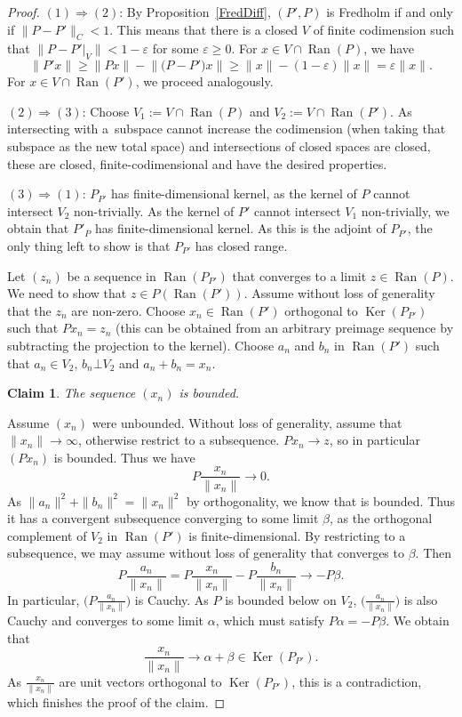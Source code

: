 \documentclass[pdftex]{sigma}
\numberwithin{equation}{section}
\newtheorem*{Claim}{Claim}
\DeclareMathOperator{\Ran}{Ran}
\DeclareMathOperator{\Ker}{Ker}
\begin{document}
	\begin{proof}
		$(1) \Rightarrow (2)$: By Proposition~\ref{FredDiff}, $(P',{P})$ is Fredholm if and only if $\|P-{P'}\|_C<1$. This means that there is a closed $V$ of finite codimension such that $\|P-{P'}|_V\|<1-\varepsilon$ for some $\varepsilon\geq 0$. For $x\in V\cap\Ran(P)$, we have
		\[\bigl\|{P'}x\bigr\|\geq\|Px\|-\bigl\|\bigl(P-{P'}\bigr)x\bigr\|\geq\|x\|-(1-\varepsilon)\|x\|=\varepsilon\|x\|.\]
		For $x\in V\cap \Ran({P'})$, we proceed analogously.
		
		$(2) \Rightarrow (3)$: Choose $V_1:=V\cap \Ran(P)$ and $V_2:=V\cap \Ran({P'})$. As intersecting with a~subspace cannot increase the codimension (when taking that subspace as the new total space) and intersections of closed spaces are closed, these are closed, finite-codimensional and have the desired properties.
				
		$(3)\Rightarrow (1)$:	
		$P_{P'}$ has finite-dimensional kernel, as the kernel of $P$ cannot intersect $V_2$ non-trivially. As the kernel of ${P'}$ cannot intersect $V_1$ non-trivially, we obtain that ${P'}_P$ has finite-dimensional kernel. As this is the adjoint of $P_{P'}$, the only thing left to show is that $P_{P'}$ has closed range.
		
		Let $(z_n)$ be a sequence in $\Ran(P_{P'})$ that converges to a limit $z\in\Ran(P)$. We need to show that $z\in P(\Ran(P'))$. Assume without loss of generality that the $z_n$ are non-zero. Choose $x_n\in \Ran({P'})$ orthogonal to $\Ker(P_{P'})$ such that $Px_n=z_n$ (this can be obtained from an arbitrary preimage sequence by subtracting the projection to the kernel). Choose $a_n$ and $b_n$ in $\Ran({P'})$ such that $a_n\in V_2$, $b_n\bot V_2$ and $a_n+b_n=x_n$.
		
\begin{Claim}
The sequence $(x_n)$ is bounded.
\end{Claim}
		
		Assume $(x_n)$ were unbounded. Without loss of generality, assume that $\|x_n\|\rightarrow\infty$, otherwise restrict to a subsequence. $Px_n\rightarrow z$, so in particular $(Px_n)$ is bounded. Thus we have
		\[P\frac{x_n}{\|x_n\|}\rightarrow 0.\]
		As $\|a_n\|^2+\|b_n\|^2=\|x_n\|^2$ by orthogonality, we know that  is bounded. Thus it has a convergent subsequence converging to some limit $\beta$, as the orthogonal complement of $V_2$ in $\Ran({P'})$ is finite-dimensional. By restricting to a subsequence, we may assume without loss of generality that  converges to $\beta$. Then
\[
P\frac{a_n}{\|x_n\|}=P\frac{x_n}{\|x_n\|}-P\frac{b_n}{\|x_n\|}\rightarrow-P\beta.
\]
		In particular, $\bigl(P\frac{a_n}{\|x_n\|}\bigr)$ is Cauchy. As $P$ is bounded below on $V_2$, $\bigl(\frac{a_n}{\|x_n\|}\bigr)$ is also Cauchy and converges to some limit $\alpha$, which must satisfy $P\alpha=-P\beta$. We obtain that
\[
\frac{x_n}{\|x_n\|}\rightarrow \alpha+\beta\in \Ker(P_{P'}).
\]
		As $\frac{x_n}{\|x_n\|}$ are unit vectors orthogonal to $\Ker(P_{P'})$, this is a contradiction, which finishes the proof of the claim.
		

\end{proof}
\end{document}
